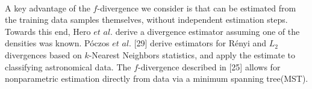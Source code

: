 \documentclass{article}
\begin{document}
	\\ [0.5ex]	
	\indent A key advantage of the $f$-divergence we consider is that can be estimated from the training data samples themselves, without independent estimation steps. Towards this end, Hero $et$ $al.$ derive a divergence estimator assuming one of the densities was known. P{\'o}czos $et$ $al.$ [29] derive estimators for R{\'e}nyi and $L_2$ divergences based on $k$-Nearest Neighbors statistics, and apply the estimate to classifying astronomical data. The $f$-divergence described in [25] allows for nonparametric estimation directly from data via a minimum spanning tree(MST). 
\end{document}
